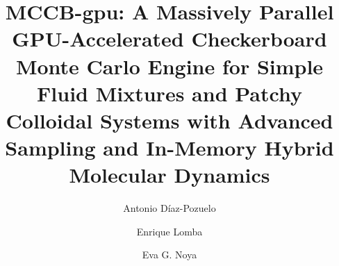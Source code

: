 \documentclass[final,5p,times,twocolumn]{elsarticle}
\begin{document}
\begin{frontmatter}

\title{\textbf{MCCB-gpu: A Massively Parallel GPU-Accelerated
    Checkerboard Monte Carlo Engine for Simple Fluid Mixtures and
    Patchy Colloidal Systems with Advanced Sampling and In-Memory Hybrid Molecular Dynamics}}

\author[iqf]{Antonio D{\'{i}}az-Pozuelo}
\author[iqf]{Enrique Lomba}
\author[iqf]{Eva G. Noya}{}

\address[iqf]{Instituto de Qu{\'{i}}mica F{\'{i}}sica Blas Cabrera
  (IQF-CSIC), CSIC, Serrano 119, 28006 Madrid, Spain}


\end{frontmatter}
\end{document}
